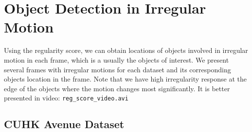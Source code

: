 \documentclass[10pt,twocolumn,letterpaper]{article}
\begin{document}
\section{Object Detection in Irregular Motion}
\label{sec:obj_det}
Using the regularity score, we can obtain locations of objects involved in irregular motion in each frame, which is a usually the objects of interest.
We present several frames with irregular motions for each dataset and its corresponding objects location in the frame.
Note that we have high irregularity response at the edge of the objects where the motion changes most significantly.
It is better presented in video: \texttt{reg\_score\_video.avi}

\subsection{CUHK Avenue Dataset}
\label{sec:obj_det_avenue}
\end{document}

